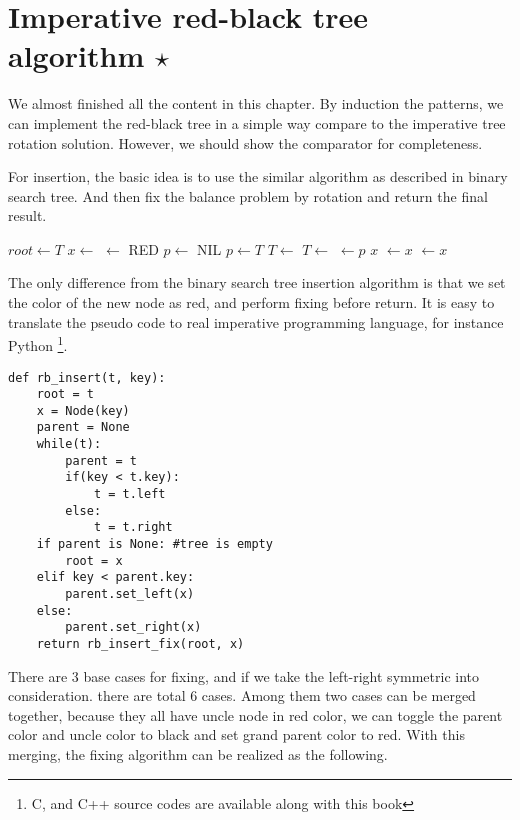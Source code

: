 \documentclass{article}
\begin{document}
\section{Imperative red-black tree algorithm $\star$}

We almost finished all the content in this chapter. By induction
the patterns, we can implement the red-black tree in a simple way
compare to the imperative tree rotation solution. However, we
should show the comparator for completeness.

For insertion, the basic idea is to use the similar algorithm
as described in binary search tree. And then fix the balance
problem by rotation and return the final result.

\begin{algorithmic}[1]
  \State $root \gets T$
  \State $x \gets$ 
  \State {} $\gets$ RED
  \State $p \gets$ NIL
    \State $p \gets T$
      \State $T \gets $ 
    \Else
      \State $T \gets $ 
    \EndIf
  \EndWhile
  \State {} $\gets p$
   
    \State \Return $x$
    \State {} $\gets x$
  \Else
    \State {} $\gets x$
  \EndIf
  \State \Return {}
\EndFunction
\end{algorithmic}

The only difference from the binary search tree insertion algorithm
is that we set the color of the new node as red, and perform fixing
before return. It is easy to translate the pseudo code to real
imperative programming language, for instance Python \footnote{C,
and C++ source codes are available along with this book}.

\lstset{language=Python}
\begin{lstlisting}
def rb_insert(t, key):
    root = t
    x = Node(key)
    parent = None
    while(t):
        parent = t
        if(key < t.key):
            t = t.left
        else:
            t = t.right
    if parent is None: #tree is empty
        root = x
    elif key < parent.key:
        parent.set_left(x)
    else:
        parent.set_right(x)
    return rb_insert_fix(root, x)
\end{lstlisting}

There are 3 base cases for fixing, and if we take the left-right
symmetric into consideration. there are total 6 cases.
Among them two cases can be merged together, because they all have
uncle node in red color, we can toggle the parent color and
uncle color to black and set grand parent color to red.
With this merging, the fixing algorithm can be realized as the following.
\end{document}
